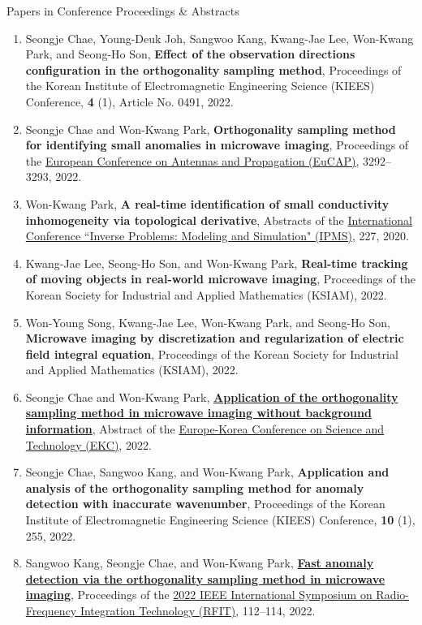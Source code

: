 \documentclass{resume} %
\begin{document}
\begin{rSection}{Papers in Conference Proceedings \& Abstracts}
\begin{enumerate}
\item\label{C-KIEES2022B} Seongje Chae, Young-Deuk Joh, Sangwoo Kang, Kwang-Jae Lee, Won-Kwang Park, and Seong-Ho Son, \textbf{Effect of the observation directions configuration in the orthogonality sampling method}, Proceedings of the Korean Institute of Electromagnetic Engineering Science (KIEES) Conference, \textbf{4} (1), Article No. 0491, 2022.
\item\label{C-EUCAP2022} Seongje Chae and Won-Kwang Park, \textbf{Orthogonality sampling method for identifying small anomalies in microwave imaging}, Proceedings of the \href{https://www.eucap.org/}{ European Conference on Antennas and Propagation (EuCAP)}, 3292--3293, 2022.
\item\label{C-IPMS2022} Won-Kwang Park, \textbf{A real-time identification of small conductivity inhomogeneity via topological derivative}, Abstracts of the \href{https://www.ipms-conference.org/ipms2022/index.php}{ International Conference ``Inverse Problems: Modeling and Simulation" (IPMS)}, 227, 2020.
\item\label{C-KSIAM2022A} Kwang-Jae Lee, Seong-Ho Son, and Won-Kwang Park, \textbf{Real-time tracking of moving objects in real-world microwave imaging}, Proceedings of the Korean Society for Industrial and Applied Mathematics (KSIAM), 2022.
\item\label{C-KSIAM2022B} Won-Young Song, Kwang-Jae Lee, Won-Kwang Park, and Seong-Ho Son, \textbf{Microwave imaging by discretization and regularization of electric field integral equation}, Proceedings of the Korean Society for Industrial and Applied Mathematics (KSIAM), 2022.
\item\label{C-EKC2022} Seongje Chae and Won-Kwang Park, \href{https://registration.ekc2022.org/access/showAbstract/196/084b6fbb10729ed4da8c3d3f5a3ae7c9}{\textbf{Application of the orthogonality sampling method in microwave imaging without background information}}, Abstract of the \href{https://www.ekc2022.org}{Europe-Korea Conference on Science and Technology (EKC)}, 2022.
\item\label{C-KIEES2022C} Seongje Chae, Sangwoo Kang, and Won-Kwang Park, \textbf{Application and analysis of the orthogonality sampling method for anomaly detection with inaccurate wavenumber}, Proceedings of the Korean Institute of Electromagnetic Engineering Science (KIEES) Conference, \textbf{10} (1), 255, 2022.
\item\label{C-RFIT2022} Sangwoo Kang, Seongje Chae, and Won-Kwang Park, \href{https://doi.org/10.1109/RFIT54256.2022.9882350}{\textbf{Fast anomaly detection via the orthogonality sampling method in microwave imaging}}, Proceedings of the \href{http://rfit2022.org}{2022 IEEE International Symposium on Radio-Frequency Integration Technology (RFIT)}, 112--114, 2022.

\end{enumerate}
\end{rSection}
\end{document}
